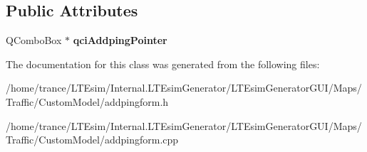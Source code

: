 \subsection*{Public Attributes}
\begin{DoxyCompactItemize}
\item 
Q\+Combo\+Box $\ast$ {\bfseries qci\+Addping\+Pointer}\hypertarget{class_add_ping_form_a6b2787b999e70601336ea0439153c1a5}{}\label{class_add_ping_form_a6b2787b999e70601336ea0439153c1a5}

\end{DoxyCompactItemize}


The documentation for this class was generated from the following files\+:\begin{DoxyCompactItemize}
\item 
/home/trance/\+L\+T\+Esim/\+Internal.\+L\+T\+Esim\+Generator/\+L\+T\+Esim\+Generator\+G\+U\+I/\+Maps/\+Traffic/\+Custom\+Model/addpingform.\+h\item 
/home/trance/\+L\+T\+Esim/\+Internal.\+L\+T\+Esim\+Generator/\+L\+T\+Esim\+Generator\+G\+U\+I/\+Maps/\+Traffic/\+Custom\+Model/addpingform.\+cpp\end{DoxyCompactItemize}

